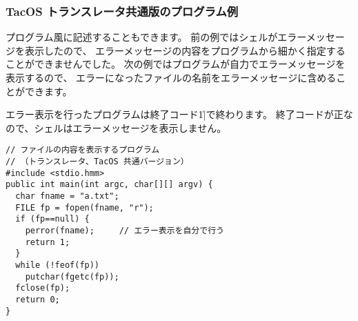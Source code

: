 \subsubsection{TacOS トランスレータ共通版のプログラム例}

\cl プログラム風に記述することもできます。
前の例ではシェルがエラーメッセージを表示したので、
エラーメッセージの内容をプログラムから細かく指定することができませんでした。
次の例ではプログラムが自力でエラーメッセージを表示するので、
エラーになったファイルの名前をエラーメッセージに含めることができます。

エラー表示を行ったプログラムは終了コード\|1|で終わります。
終了コードが正なので、シェルはエラーメッセージを表示しません。

\begin{mylist}
\begin{verbatim}
// ファイルの内容を表示するプログラム
// （トランスレータ、TacOS 共通バージョン）
#include <stdio.hmm>
public int main(int argc, char[][] argv) {
  char fname = "a.txt";
  FILE fp = fopen(fname, "r");
  if (fp==null) {
    perror(fname);     // エラー表示を自分で行う
    return 1;
  }
  while (!feof(fp))
    putchar(fgetc(fp));
  fclose(fp);
  return 0;
}
\end{verbatim}
\end{mylist}

